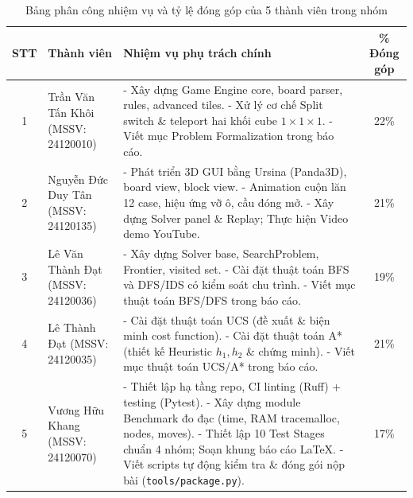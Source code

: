 \documentclass[12pt,a4paper]{article}
\begin{document}
\begin{table}[H]
\centering
\label{tab:task_distribution}
\begin{tabular}{|c|p{4cm}|p{7cm}|c|}
\hline
\textbf{STT} & \textbf{Thành viên} & \textbf{Nhiệm vụ phụ trách chính} & \textbf{\% Đóng góp} \\
\hline
1 & Trần Văn Tấn Khôi \newline (MSSV: 24120010) & 
- Xây dựng Game Engine core, board parser, rules, advanced tiles.\newline
- Xử lý cơ chế Split switch \& teleport hai khối cube $1\times1\times1$.\newline
- Viết mục Problem Formalization trong báo cáo. & 22\% \\
\hline
2 & Nguyễn Đức Duy Tân \newline (MSSV: 24120135) & 
- Phát triển 3D GUI bằng Ursina (Panda3D), board view, block view.\newline
- Animation cuộn lăn 12 case, hiệu ứng vỡ ô, cầu đóng mở.\newline
- Xây dựng Solver panel \& Replay; Thực hiện Video demo YouTube. & 21\% \\
\hline
3 & Lê Văn Thành Đạt \newline (MSSV: 24120036) & 
- Xây dựng Solver base, SearchProblem, Frontier, visited set.\newline
- Cài đặt thuật toán BFS và DFS/IDS có kiểm soát chu trình.\newline
- Viết mục thuật toán BFS/DFS trong báo cáo. & 19\% \\
\hline
4 & Lê Thành Đạt \newline (MSSV: 24120035) & 
- Cài đặt thuật toán UCS (đề xuất \& biện minh cost function).\newline
- Cài đặt thuật toán A* (thiết kế Heuristic $h_1, h_2$ \& chứng minh).\newline
- Viết mục thuật toán UCS/A* trong báo cáo. & 21\% \\
\hline
5 & Vương Hữu Khang \newline (MSSV: 24120070) & 
- Thiết lập hạ tầng repo, CI linting (Ruff) + testing (Pytest).\newline
- Xây dựng module Benchmark đo đạc (time, RAM tracemalloc, nodes, moves).\newline
- Thiết lập 10 Test Stages chuẩn 4 nhóm; Soạn khung báo cáo \LaTeX.\newline
- Viết scripts tự động kiểm tra \& đóng gói nộp bài (\texttt{tools/package.py}). & 17\% \\
\hline
\end{tabular}
\caption{Bảng phân công nhiệm vụ và tỷ lệ đóng góp của 5 thành viên trong nhóm}
\end{table}
\end{document}
